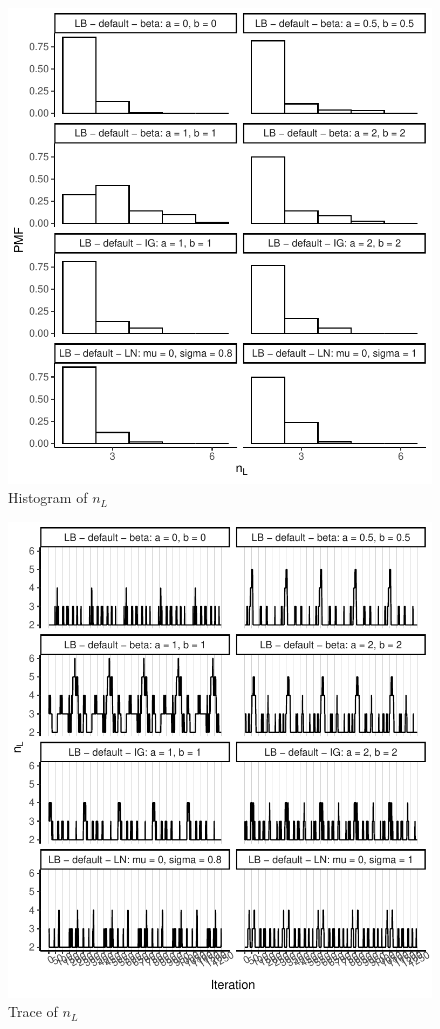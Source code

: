 \documentclass{amsart}
\begin{document}
\begin{figure}[ht]
	\centering
	\includegraphics[width=0.95\linewidth]{hist_nl_5.pdf}
	\caption{Histogram of $n_L$}
	\label{fig:hist:nl:5}
\end{figure}

\begin{figure}[ht]
	\centering
	\includegraphics[width=0.95\linewidth]{trace_nl_5.pdf}
	\caption{Trace of $n_L$}
	\label{fig:trace:nl:5}
\end{figure}
\end{document}
